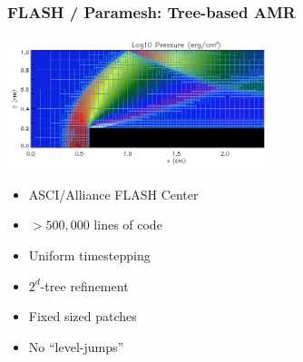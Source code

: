 \begin{frame}[fragile] \frametitle{FLASH / Paramesh: Tree-based AMR}
\centerline{\includegraphics[width=3.0in]{paramesh.png}}
\begin{minipage}{2.3in}
\begin{itemize}
\item ASCI/Alliance FLASH Center
\item $>500,000$ lines of code
\item Uniform timestepping
\end{itemize}
\end{minipage}
\begin{minipage}{1.8in}
\begin{itemize}
\item $2^d$-tree refinement 
\item Fixed sized patches
\item No ``level-jumps''
\end{itemize}
\end{minipage}

\end{frame}

% 
